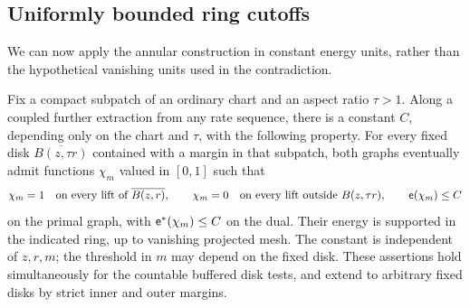 \subsection{Uniformly bounded ring cutoffs}

We can now apply the annular construction in constant energy units,
rather than the hypothetical vanishing units used in the contradiction.

\begin{proposition}\label{nd:cutoffs}
Fix a compact subpatch of an ordinary chart and an aspect ratio
$\tau>1$.  Along a coupled further extraction from any rate sequence,
there is a constant $C$, depending only on the chart and $\tau$,
with the following property.  For every fixed disk
$\overline{B(z,\tau r)}$ contained with a margin in that subpatch,
both graphs eventually admit functions $\chi_m$ valued in $[0,1]$
such that
\[
 \chi_m=1\quad\text{on every lift of }\overline{B(z,r)},
 \qquad
 \chi_m=0\quad\text{on every lift outside }B(z,\tau r),
 \qquad
 \mathsf e(\chi_m)\le C
\]
on the primal graph, with $\mathsf e^{*}(\chi_m)\le C$ on the dual.
Their energy is supported in the indicated ring, up to vanishing
projected mesh.  The constant is independent of $z,r,m$; the
threshold in $m$ may depend on the fixed disk.  These assertions
hold simultaneously for the countable buffered disk tests, and
extend to arbitrary fixed disks by strict inner and outer margins.
\end{proposition}

